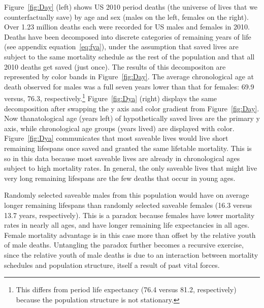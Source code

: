 \documentclass{article}
\begin{document}
Figure~\ref{fig:Day} (left) shows US 2010 period
deaths (the universe of lives that we counterfactually save) by age and sex (males on the left, females on the
right).
Over 1.23 million deaths each were recorded for US males and females in 2010. Deaths have been decomposed into discrete
categories of remaining years of life (see appendix
equation~\eqref{eq:fya}), under the assumption that saved lives are subject to
the same mortality schedule as the rest of the population and that all 2010
deaths get saved (just once). The results of this decompositon are represented
by color bands in Figure~\ref{fig:Day}. The average chronological age at death
observed for males was a full seven years lower than that for females: 69.9
versus, 76.3, respectively.\footnote{This differs from period life expectancy
(76.4 versus 81.2, respectively) because the population structure is not
stationary.}
Figure~\ref{fig:Dya} (right) displays the same decomposition after swapping the y axis and color gradient from Figure~\ref{fig:Day}. Now thanatological age (years left) of hypothetically saved lives are the primary y axis, while chronological age groups (years lived) are displayed with color. Figure~\ref{fig:Dya} communicates that most saveable lives would live short remaining lifespans once saved and granted the same lifetable mortality. This is so in this data because most saveable lives are already in chronological ages subject to high mortality rates. In general, the only saveable lives that might live very long remaining lifespans are the few deaths that occur in young ages. 

Randomly
selected saveable males from this population would have on average longer
remaining lifespans than randomly selected saveable females (16.3 versus 13.7
years, respectively). This is a paradox because females have lower mortality rates in
nearly all ages, and have longer remaining life expectancies in all ages. Female
mortality advantage is in this case more than offset by the relative youth of
male deaths. Untangling the paradox further becomes a recursive exercise,
since the relative youth of male deaths is due to an interaction between
mortality schedules and population structure, itself a result of past
vital forces.
\end{document}
